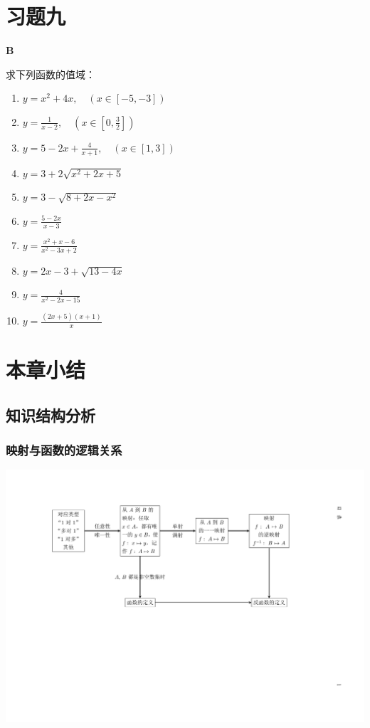 \section*{习题九}
\begin{center}
    \bfseries B
\end{center}

求下列函数的值域：
\begin{multicols}{2}
    \begin{enumerate}
    \item $y=x^2+4x,\quad (x\in[-5,-3])$
    \item $y=\frac{1}{x-2},\quad \left(x\in\left[0,\frac{3}{2}\right]\right)$
    \item $y=5-2x+\frac{4}{x+1},\quad (x\in[1,3])$
    \item $y=3+2\sqrt{x^2+2x+5}$
    \item $y=3-\sqrt{8+2x-x^2}$
    \item $y=\frac{5-2x}{x-3}$
    \item $y=\frac{x^2+x-6}{x^2-3x+2}$
    \item $y=2x-3+\sqrt{13-4x}$
    \item $y=\frac{4}{x^2-2x-15}$
    \item $y=\frac{(2x+5)(x+1)}{x}$
\end{enumerate}
\end{multicols}

\section{本章小结}
\subsection{知识结构分析}
\subsubsection{映射与函数的逻辑关系}

\begin{center}
\includegraphics[scale=.75]{fig/fig2.pdf}
\end{center}

